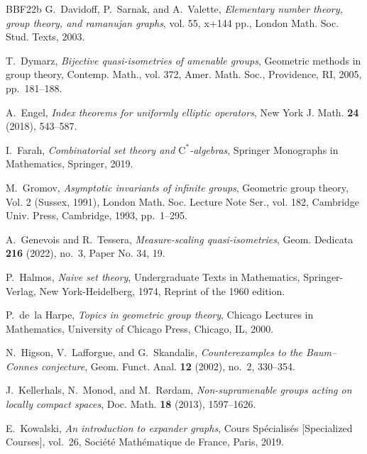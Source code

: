 \documentclass[11pt]{amsart}
\newcommand{\cstar}{$\mathrm{C}^*$}
\numberwithin{equation}{section}
\theoremstyle{definition}
\theoremstyle{remark}
\numberwithin{equation}{section}
\begin{document}
\begin{thebibliography}{BBF{\etalchar{+}}22b}
G.~Davidoff, P.~Sarnak, and A.~Valette, \emph{Elementary number theory, group
  theory, and ramanujan graphs}, vol. 55, x+144 pp., London Math. Soc. Stud.
  Texts, 2003.

T.~Dymarz, \emph{Bijective quasi-isometries of amenable groups}, Geometric
  methods in group theory, Contemp. Math., vol. 372, Amer. Math. Soc.,
  Providence, RI, 2005, pp.~181--188. 

A.~Engel, \emph{Index theorems for uniformly elliptic operators}, New York J.
  Math. \textbf{24} (2018), 543--587.

I.~Farah, \emph{Combinatorial set theory and \cstar-algebras}, Springer
  Monographs in Mathematics, Springer, 2019.

M.~Gromov, \emph{Asymptotic invariants of infinite groups}, Geometric group
  theory, {V}ol. 2 ({S}ussex, 1991), London Math. Soc. Lecture Note Ser., vol.
  182, Cambridge Univ. Press, Cambridge, 1993, pp.~1--295. 

A.~Genevois and R.~Tessera, \emph{Measure-scaling quasi-isometries}, Geom.
  Dedicata \textbf{216} (2022), no.~3, Paper No. 34, 19. 

P.~Halmos, \emph{Naive set theory}, Undergraduate Texts in Mathematics,
  Springer-Verlag, New York-Heidelberg, 1974, Reprint of the 1960 edition.

P.~de~la Harpe, \emph{Topics in geometric group theory}, Chicago Lectures in
  Mathematics, University of Chicago Press, Chicago, IL, 2000. 

N.~Higson, V.~Lafforgue, and G.~Skandalis, \emph{Counterexamples to the
  {B}aum--{C}onnes conjecture}, Geom. Funct. Anal. \textbf{12} (2002), no.~2,
  330--354.

J.~Kellerhals, N.~Monod, and M.~R\o{}rdam, \emph{Non-supramenable groups acting
  on locally compact spaces}, Doc. Math. \textbf{18} (2013), 1597--1626.

E.~Kowalski, \emph{An introduction to expander graphs}, Cours
  Sp\'{e}cialis\'{e}s [Specialized Courses], vol.~26, Soci\'{e}t\'{e}
  Math\'{e}matique de France, Paris, 2019. 


\end{thebibliography}
\end{document}
